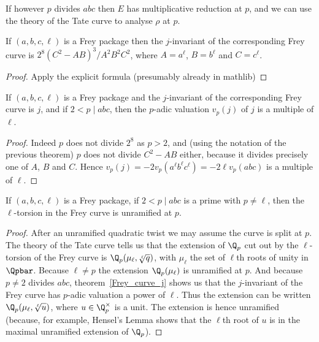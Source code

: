 If however $p$ divides $abc$ then $E$ has multiplicative 
reduction at $p$, and we can use the theory of the Tate curve to analyse $\rho$ at $p$.

\begin{theorem}\label{Frey_curve_j} If $(a,b,c,\ell)$ is a Frey package then the $j$-invariant of the corresponding Frey curve is $2^8(C^2-AB)^3/A^2B^2C^2$, where $A=a^\ell$, $B=b^\ell$ and $C=c^\ell$.
\end{theorem}
\begin{proof}
  Apply the explicit formula (presumably already in mathlib)
\end{proof}

\begin{corollary}
  \label{FLT.FreyPackage.FreyCurve.j_valuation_of_bad_prime}
  If $(a,b,c,\ell)$ is a Frey package and the $j$-invariant of the corresponding Frey curve is $j$, and if $2<p\mid abc$, then the $p$-adic valuation $v_p(j)$ of $j$ is a multiple of $\ell$.
\end{corollary}
\begin{proof} Indeed $p$ does not divide $2^8$ as $p>2$, and (using the notation of the previous theorem) $p$ does not divide $C^2-AB$ either, because it divides precisely one of $A$, $B$ and $C$. Hence $v_p(j)=-2v_p(a^\ell b^\ell c^\ell)=-2\ell v_p(abc)$ is a multiple of $\ell$.
\end{proof}

\begin{corollary}\label{Frey_curve_unram}\notready If $(a,b,c,\ell)$ is a Frey package, if $2<p\mid abc$
  is a prime with $p\not=\ell$, then the $\ell$-torsion in the Frey curve is unramified
  at $p$.
\end{corollary}
\begin{proof} After an unramified quadratic twist we may assume the curve is split at $p$.
  The theory of the Tate curve tells us that the extension of $\Q_p$ cut out by the $\ell$-torsion
  of the Frey curve is $\Q_p(\mu_\ell,\sqrt[\ell]{q})$, with $\mu_\ell$ the set of $\ell$th roots
  of unity in $\Qpbar$. Because $\ell\not=p$ the extension
  $\Q_p(\mu_\ell)$ is unramified at $p$. And because $p\not=2$ divides $abc$, 
  theorem~\ref{Frey_curve_j} shows us that the $j$-invariant of the Frey curve has $p$-adic
  valuation a power of $\ell$. Thus the extension can be written $\Q_p(\mu_\ell,\sqrt[\ell]{u})$,
  where $u\in\Q_p^\times$ is a unit. The extension is hence unramified (because, for example,
  Hensel's Lemma shows that the $\ell$th root of $u$ is in the maximal unramified
  extension of $\Q_p$).
\end{proof}

